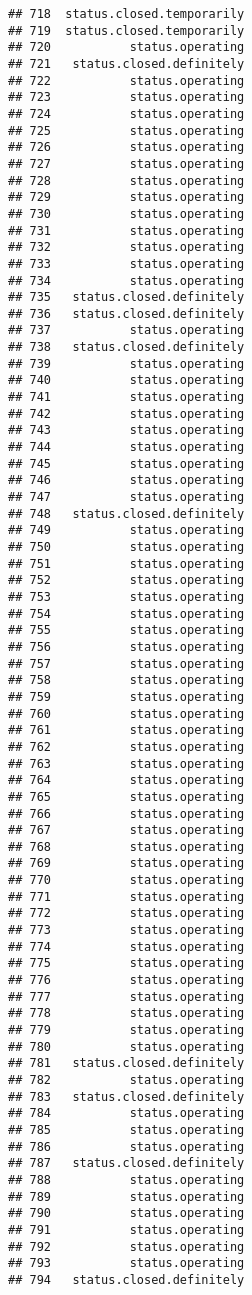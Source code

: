 \documentclass[
]{article}
\begin{document}
\begin{verbatim}
## 718  status.closed.temporarily
## 719  status.closed.temporarily
## 720           status.operating
## 721   status.closed.definitely
## 722           status.operating
## 723           status.operating
## 724           status.operating
## 725           status.operating
## 726           status.operating
## 727           status.operating
## 728           status.operating
## 729           status.operating
## 730           status.operating
## 731           status.operating
## 732           status.operating
## 733           status.operating
## 734           status.operating
## 735   status.closed.definitely
## 736   status.closed.definitely
## 737           status.operating
## 738   status.closed.definitely
## 739           status.operating
## 740           status.operating
## 741           status.operating
## 742           status.operating
## 743           status.operating
## 744           status.operating
## 745           status.operating
## 746           status.operating
## 747           status.operating
## 748   status.closed.definitely
## 749           status.operating
## 750           status.operating
## 751           status.operating
## 752           status.operating
## 753           status.operating
## 754           status.operating
## 755           status.operating
## 756           status.operating
## 757           status.operating
## 758           status.operating
## 759           status.operating
## 760           status.operating
## 761           status.operating
## 762           status.operating
## 763           status.operating
## 764           status.operating
## 765           status.operating
## 766           status.operating
## 767           status.operating
## 768           status.operating
## 769           status.operating
## 770           status.operating
## 771           status.operating
## 772           status.operating
## 773           status.operating
## 774           status.operating
## 775           status.operating
## 776           status.operating
## 777           status.operating
## 778           status.operating
## 779           status.operating
## 780           status.operating
## 781   status.closed.definitely
## 782           status.operating
## 783   status.closed.definitely
## 784           status.operating
## 785           status.operating
## 786           status.operating
## 787   status.closed.definitely
## 788           status.operating
## 789           status.operating
## 790           status.operating
## 791           status.operating
## 792           status.operating
## 793           status.operating
## 794   status.closed.definitely

\end{verbatim}
\end{document}
